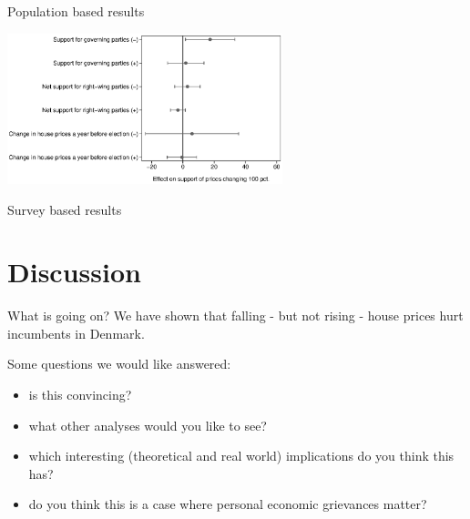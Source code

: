 \documentclass[aspectratio=169]{beamer}
\begin{document}
\begin{frame}{Population based results}
	\begin{center}
			\includegraphics[width=0.6\textwidth]{../../figures/robust.eps}
	\end{center}
\end{frame}	

\begin{frame}{Survey based results}
	
\end{frame}	

\section{Discussion}

	\begin{frame}{What is going on?}
	We have shown that falling - but not rising - house prices hurt incumbents in Denmark.
	
	\vspace{0.2in}
	
	Some questions we would like answered:
	\begin{itemize}
		\item is this convincing?
		\item what other analyses would you like to see?
		\item which interesting (theoretical and real world) implications do you think this has?
		\item do you think this is a case where personal economic grievances matter? 
	\end{itemize}	
		
	\end{frame}		
\end{document}
